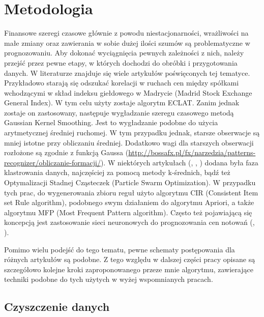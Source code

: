 \documentclass[polish, twoside, 12pt, a4paper]{article}
\theoremstyle{definition}
\theoremstyle{plain}
\theoremstyle{remark}
\begin{document}
\clearpage
\section{Metodologia}

Finansowe szeregi czasowe głównie z powodu niestacjonarności, wrażliwości na małe zmiany oraz zawierania w sobie dużej ilości
szumów są problematyczne w prognozowaniu. Aby dokonać wyciągnięcia pewnych zależności z nich, należy przejść przez pewne etapy, w których dochodzi do obróbki i  przygotowania danych.  W literaturze znajduje się wiele artykułów poświęconych tej tematyce. 
Przykładowo \cite{Dante2010} starają się odszukać korelacji w ruchach cen między spółkami wchodzącymi w skład indeksu giełdowego w Madrycie (Madrid Stock Exchange General Index). W tym celu użyty zostaje algorytm ECLAT. Zanim jednak zostaje 
on zastosowany, następuje wygładzanie szeregu czasowego metodą Gaussian Kernel Smoothing. Jest to wygładzanie podobne do użycia arytmetycznej średniej ruchomej. W tym przypadku jednak, starsze obserwacje są mniej istotne przy obliczaniu 
średniej. Dodatkowo wagi dla starszych obserwacji rozłożone są zgodnie z funkcją Gaussa (\url{http://bossafx.pl/fx/narzedzia/patterns-recognizer/obliczanie-formacji/}). W niektórych artykułach (\cite{Gandhmal2011}, \cite{Khan2011}, \cite{Aragianni2010}) dodana była faza 
klastrowania danych, najczęściej za pomocą metody k-średnich, bądź też Optymalizacji Stadnej Cząsteczek (Particle Swarm Optimization). W przypadku tych prac, do wygenerowania zbioru reguł użyto algorytmu CIR (Consistent Item set Rule algorithm), 
podobnego swym działaniem do algorytmu Apriori, a także algorytmu MFP (Most Frequent Pattern algorithm). Często też pojawiającą się koncepcją jest zastosowanie sieci neuronowych do prognozowania cen notowań (\cite{Kaastra1996}, \cite{Virili2001}). 

Pomimo wielu podejść do tego tematu, pewne schematy postępowania dla różnych artykułów są podobne. Z tego względu w dalszej części pracy opisane są szczegółowo kolejne kroki zaproponowanego przeze mnie algorytmu, zawierające techniki podobne 
do tych użytych w wyżej wspomnianych pracach.

\subsection{Czyszczenie danych}
\end{document}
